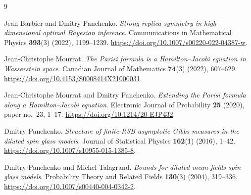 \documentclass[11pt,letterpaper]{article}
\begin{document}
\begin{thebibliography}{9}

 Jean Barbier and Dmitry Panchenko. \emph{Strong replica symmetry in high-dimensional optimal Bayesian inference}. Communications in Mathematical Physics \textbf{393}(3) (2022), 1199--1239. \url{https://doi.org/10.1007/s00220-022-04387-w}.

 Jean-Christophe Mourrat. \emph{The Parisi formula is a Hamilton--Jacobi equation in Wasserstein space}. Canadian Journal of Mathematics \textbf{74}(3) (2022), 607--629. \url{https://doi.org/10.4153/S0008414X21000031}.

 Jean-Christophe Mourrat and Dmitry Panchenko. \emph{Extending the Parisi formula along a Hamilton--Jacobi equation}. Electronic Journal of Probability \textbf{25} (2020), paper no.~23, 1--17. \url{https://doi.org/10.1214/20-EJP432}.

 Dmitry Panchenko. \emph{Structure of finite-RSB asymptotic Gibbs measures in the diluted spin glass models}. Journal of Statistical Physics \textbf{162}(1) (2016), 1--42. \url{https://doi.org/10.1007/s10955-015-1385-8}.

 Dmitry Panchenko and Michel Talagrand. \emph{Bounds for diluted mean-fields spin glass models}. Probability Theory and Related Fields \textbf{130}(3) (2004), 319--336. \url{https://doi.org/10.1007/s00440-004-0342-2}.
\end{thebibliography}
\end{document}
